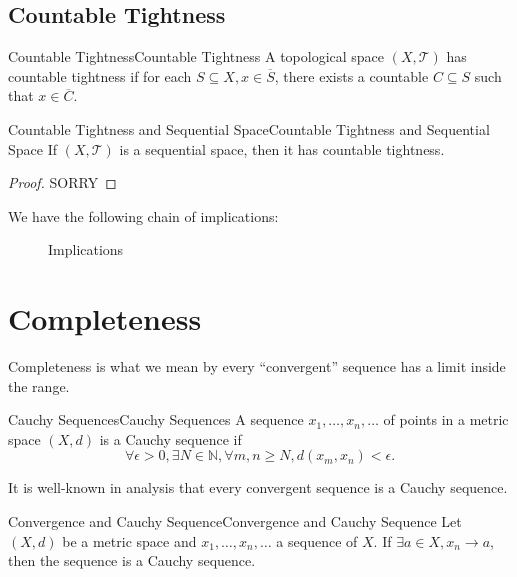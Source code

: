 \documentclass[../main.tex]{subfiles}
\begin{document}
\subsection{Countable Tightness}
\begin{definition}{Countable Tightness}{Countable Tightness}
A topological space $(X,\mathcal{T})$ has countable tightness if for each $S \subseteq X, x\in \overline{S}$, there exists a countable $C \subseteq S$ such that $x\in \overline{C}$.
\end{definition}

\begin{proposition}{Countable Tightness and Sequential Space}{Countable Tightness and Sequential Space}
If $(X,\mathcal{T})$ is a sequential space, then it has countable tightness.
\end{proposition}
\begin{proof}
SORRY
\end{proof}

We have the following chain of implications:

\begin{figure}[ht]
    \centering
    \caption{Implications}
    \label{fig:implications}
\end{figure}

\section{Completeness}
Completeness is what we mean by every ``convergent'' sequence has a limit inside the range. 

\begin{definition}{Cauchy Sequences}{Cauchy Sequences}
A sequence $x_1, \ldots ,x_n, \ldots $ of points in a metric space $(X,d)$ is a Cauchy sequence if
\begin{equation}
\forall \epsilon>0,\exists N\in \mathbb{N}, \forall m,n \geq N, d(x_m,x_n) <\epsilon.
\end{equation}
\end{definition}

It is well-known in analysis that every convergent sequence is a Cauchy sequence.
\begin{proposition}{Convergence and Cauchy Sequence}{Convergence and Cauchy Sequence}
Let $(X,d)$ be a metric space and $x_1, \ldots ,x_n, \ldots $ a sequence of $X$. If $\exists a\in X, x_n \rightarrow a$, then the sequence is a Cauchy sequence.
\end{proposition}
\end{document}
